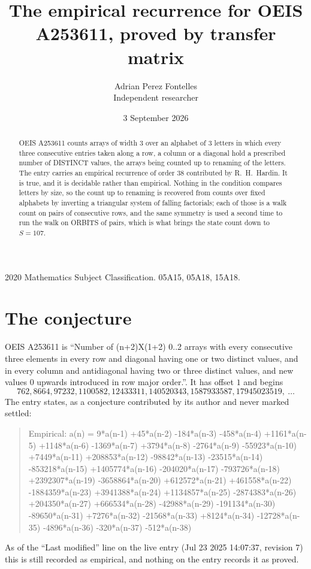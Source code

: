 \documentclass[11pt,a4paper]{article}
\title{The empirical recurrence for OEIS A253611, proved by transfer matrix}
\author{Adrian Perez Fontelles\\ \small Independent researcher}
\date{3 September 2026}
\theoremstyle{plain}
\theoremstyle{definition}
\begin{document}
\maketitle

\begin{abstract}
OEIS A253611 counts arrays of width $3$ over an alphabet of $3$ letters in which every three
consecutive entries taken along a row, a column or a diagonal hold a prescribed number of
DISTINCT values, the arrays being counted up to renaming of the letters. The entry carries an
empirical recurrence of order $38$ contributed by R.~H.~Hardin. It is true, and it is
decidable rather than empirical. Nothing in the condition compares letters by size, so the
count up to renaming is recovered from counts over fixed alphabets by inverting a triangular
system of falling factorials; each of those is a walk count on pairs of consecutive rows, and
the same symmetry is used a second time to run the walk on ORBITS of pairs, which is what
brings the state count down to $S=107$.
\end{abstract}

\noindent\small 2020 Mathematics Subject Classification. 05A15, 05A18, 15A18.\normalsize

\section{The conjecture}

OEIS A253611 is ``Number of (n+2)X(1+2) 0..2 arrays with every consecutive three elements in every row and diagonal having one or two distinct values, and in every column and antidiagonal having two or three distinct values, and new values 0 upwards introduced in row major order.''. It has offset $1$ and begins
\[
762, 8664, 97232, 1100582, 12433311, 140520343, 1587933587, 17945023519,\ \dots
\]
The entry states, as a conjecture contributed by its author and never marked settled:
\begin{quote}
Empirical: a(n) = 9*a(n-1) +45*a(n-2) -184*a(n-3) -458*a(n-4) +1161*a(n-5) +1148*a(n-6) -1369*a(n-7) +3794*a(n-8) -2764*a(n-9) -55923*a(n-10) +7449*a(n-11) +208853*a(n-12) -98842*a(n-13) -23515*a(n-14) -853218*a(n-15) +1405774*a(n-16) -204020*a(n-17) -793726*a(n-18) +2392307*a(n-19) -3658864*a(n-20) +612572*a(n-21) +461558*a(n-22) -1884359*a(n-23) +3941388*a(n-24) +1134857*a(n-25) -2874383*a(n-26) +204350*a(n-27) +666534*a(n-28) -42988*a(n-29) -191134*a(n-30) -89650*a(n-31) +7276*a(n-32) -21568*a(n-33) +8124*a(n-34) -12728*a(n-35) -4896*a(n-36) -320*a(n-37) -512*a(n-38)
\end{quote}
As of the ``Last modified'' line on the live entry (Jul 23 2025 14:07:37, revision 7) this is still
recorded as empirical, and nothing on the entry records it as proved.
\end{document}
